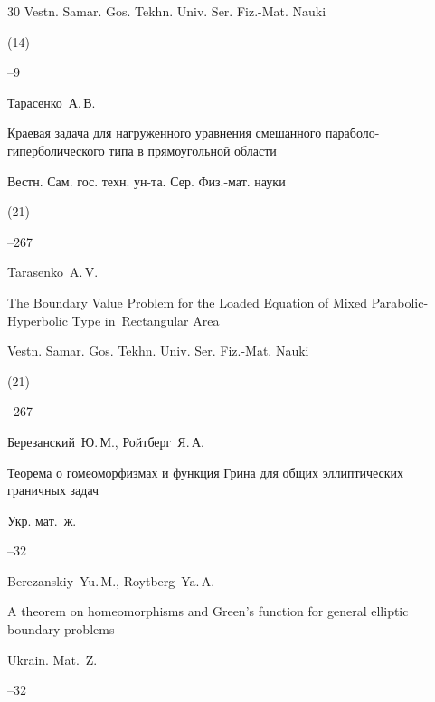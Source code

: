 \begin{thebibliography}{30}
\jour Vestn. Samar. Gos. Tekhn. Univ. Ser. Fiz.-Mat. Nauki


(14)

--9



\pagebreak




\by Тарасенко~А.\,В.

\paper Краевая задача для нагруженного уравнения смешанного параболо-гиперболического типа в прямоугольной области

\jour Вестн. Сам. гос. техн. ун-та. Сер. Физ.-мат. науки


(21)

--267

\misctransl

\by Tarasenko~A.\,V.

\paper The Boundary Value Problem for the Loaded Equation of Mixed Parabolic-Hyperbolic Type in~Rectangular Area

\jour Vestn. Samar. Gos. Tekhn. Univ. Ser. Fiz.-Mat. Nauki


(21)

--267




\by Березанский~Ю.\,М.,  Ройтберг~Я.\,А.

\paper Теорема о гомеоморфизмах и функция Грина для общих эллиптических граничных задач

\jour Укр. мат.~ж.




--32

\misctransl

\by Berezanskiy~Yu.\,M., Roytberg~Ya.\,A.

\paper A theorem on homeomorphisms and Green's function for general elliptic boundary problems

\jour Ukrain. Mat.~Z.




–32




\end{thebibliography}
